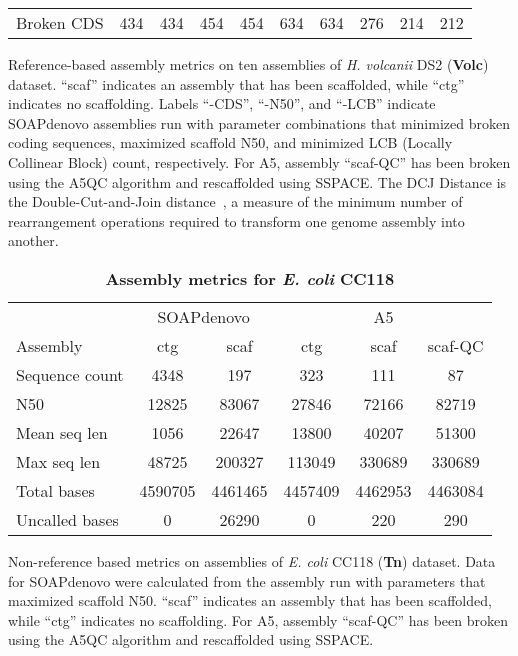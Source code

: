 \documentclass[10pt]{article}
\begin{document}
\begin{table}[hp]
\begin{tabular}{l|cccccc|ccc}
Broken CDS         & 434     & 434      & 454     & 454      & 634     & 634      & 276    & 214      & 212     \\
\end{tabular}
\begin{flushleft} Reference-based assembly metrics on ten assemblies of \textit{H. volcanii} DS2 
(\textbf{Volc}) dataset. ``scaf'' indicates an assembly that has been scaffolded, while ``ctg'' indicates no scaffolding. 
Labels ``-CDS'', ``-N50'', and ``-LCB'' indicate SOAPdenovo assemblies run with parameter combinations that minimized broken coding 
sequences, maximized scaffold N50, and minimized LCB (Locally Collinear Block) count, respectively. For A5, assembly ``scaf-QC'' has been 
broken using the A5QC algorithm and rescaffolded using SSPACE. The DCJ Distance is the Double-Cut-and-Join distance~\cite{Bergeron2006},
a measure of the minimum number of rearrangement operations required to transform one genome assembly into another.
\end{flushleft}
\label{tab:tab01}
\end{table}


\begin{table}[hp]
\caption{  
\bf{Assembly metrics for \emph{E. coli} CC118}}
{\begin{tabular}{l|cc|ccc}
& \multicolumn{2}{c|}{SOAPdenovo} & \multicolumn{3}{c}{A5} \\
Assembly        & ctg     & scaf    & ctg     & scaf    & scaf-QC \\
Sequence count  & 4348    & 197     & 323     & 111     & 87      \\
N50             & 12825   & 83067   & 27846   & 72166   & 82719   \\
Mean seq len    & 1056    & 22647   & 13800   & 40207   & 51300   \\
Max seq len     & 48725   & 200327  & 113049  & 330689  & 330689  \\
Total bases     & 4590705 & 4461465 & 4457409 & 4462953 & 4463084 \\
Uncalled bases  & 0       & 26290   & 0       & 220     & 290     \\
\end{tabular}}
\begin{flushleft} Non-reference based metrics on assemblies of \emph{E. coli} CC118 (\textbf{Tn}) dataset. Data
for SOAPdenovo were calculated from the assembly run with parameters that maximized scaffold N50. 
``scaf'' indicates an assembly that has been scaffolded, while ``ctg'' indicates no scaffolding. For A5, assembly ``scaf-QC'' has been 
broken using the A5QC algorithm and rescaffolded using SSPACE.
\end{flushleft}
\label{tab:tab02}
\end{table}
\end{document}

